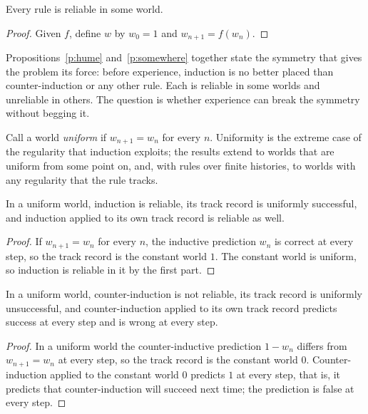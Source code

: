 \documentclass{situationist-preprint}
\begin{document}
\begin{proposition}\label{p:somewhere}
Every rule is reliable in some world.
\end{proposition}

\begin{proof}
Given $f$, define $w$ by $w_0 = 1$ and $w_{n+1} = f(w_n)$.
\end{proof}

Propositions~\ref{p:hume} and~\ref{p:somewhere} together state the symmetry that gives the problem its force: before experience, induction is no better placed than counter-induction or any other rule. Each is reliable in some worlds and unreliable in others. The question is whether experience can break the symmetry without begging it.

Call a world \emph{uniform} if $w_{n+1} = w_n$ for every $n$. Uniformity is the extreme case of the regularity that induction exploits; the results extend to worlds that are uniform from some point on, and, with rules over finite histories, to worlds with any regularity that the rule tracks.

\begin{theorem}\label{t:support}
In a uniform world, induction is reliable, its track record is uniformly successful, and induction applied to its own track record is reliable as well.
\end{theorem}

\begin{proof}
If $w_{n+1} = w_n$ for every $n$, the inductive prediction $w_n$ is correct at every step, so the track record is the constant world $1$. The constant world is uniform, so induction is reliable in it by the first part.
\end{proof}

\begin{proposition}\label{p:counter}
In a uniform world, counter-induction is not reliable, its track record is uniformly unsuccessful, and counter-induction applied to its own track record predicts success at every step and is wrong at every step.
\end{proposition}

\begin{proof}
In a uniform world the counter-inductive prediction $1 - w_n$ differs from $w_{n+1} = w_n$ at every step, so the track record is the constant world $0$. Counter-induction applied to the constant world $0$ predicts $1$ at every step, that is, it predicts that counter-induction will succeed next time; the prediction is false at every step.
\end{proof}
\end{document}
